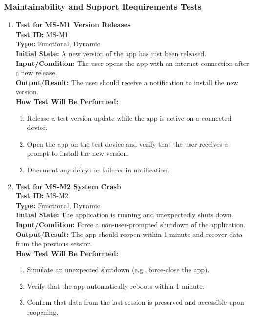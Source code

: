 \documentclass[12pt, titlepage]{article}
\begin{document}
\subsubsection{Maintainability and Support Requirements Tests}
\label{MS}
\begin{enumerate}
    \item \textbf{Test for MS-M1 Version Releases} \\
      \newline
      \textbf{Test ID:} MS-M1 \\
      \textbf{Type:} Functional, Dynamic \\
      \textbf{Initial State:} A new version of the app has just been released. \\
      \textbf{Input/Condition:} The user opens the app with an internet connection after a new release. \\
      \textbf{Output/Result:} The user should receive a notification to install the new version. \\
      \textbf{How Test Will Be Performed:}
      \begin{enumerate}
          \item Release a test version update while the app is active on a connected device.
          \item Open the app on the test device and verify that the user receives a prompt to install the new version.
          \item Document any delays or failures in notification.
      \end{enumerate}

    \item \textbf{Test for MS-M2 System Crash} \\
      \newline
      \textbf{Test ID:} MS-M2 \\
      \textbf{Type:} Functional, Dynamic \\
      \textbf{Initial State:} The application is running and unexpectedly shuts down. \\
      \textbf{Input/Condition:} Force a non-user-prompted shutdown of the application. \\
      \textbf{Output/Result:} The app should reopen within 1 minute and recover data from the previous session. \\
      \textbf{How Test Will Be Performed:}
      \begin{enumerate}
          \item Simulate an unexpected shutdown (e.g., force-close the app).
          \item Verify that the app automatically reboots within 1 minute.
          \item Confirm that data from the last session is preserved and accessible upon reopening.
      \end{enumerate}


\end{enumerate}
\end{document}
